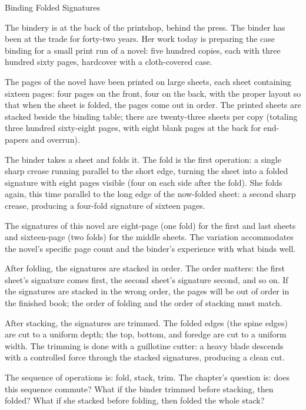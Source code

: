 \begin{coda}{Binding Folded Signatures}

The bindery is at the back of the printshop, behind the press. The
binder has been at the trade for forty-two years. Her work today is
preparing the case binding for a small print run of a novel: five
hundred copies, each with three hundred sixty pages, hardcover with
a cloth-covered case.

The pages of the novel have been printed on large sheets, each sheet
containing sixteen pages: four pages on the front, four on the back,
with the proper layout so that when the sheet is folded, the pages
come out in order. The printed sheets are stacked beside the binding
table; there are twenty-three sheets per copy (totaling three hundred
sixty-eight pages, with eight blank pages at the back for end-papers
and overrun).

The binder takes a sheet and folds it. The fold is the first
operation: a single sharp crease running parallel to the short edge,
turning the sheet into a folded signature with eight pages visible
(four on each side after the fold). She folds again, this time
parallel to the long edge of the now-folded sheet: a second sharp
crease, producing a four-fold signature of sixteen pages.

The signatures of this novel are eight-page (one fold) for the
first and last sheets and sixteen-page (two folds) for the middle
sheets. The variation accommodates the novel's specific page count
and the binder's experience with what binds well.

After folding, the signatures are stacked in order. The order matters:
the first sheet's signature comes first, the second sheet's signature
second, and so on. If the signatures are stacked in the wrong order,
the pages will be out of order in the finished book; the order of
folding and the order of stacking must match.

After stacking, the signatures are trimmed. The folded edges (the
spine edges) are cut to a uniform depth; the top, bottom, and
foredge are cut to a uniform width. The trimming is done with a
guillotine cutter: a heavy blade descends with a controlled force
through the stacked signatures, producing a clean cut.

The sequence of operations is: fold, stack, trim. The chapter's
question is: does this sequence commute? What if the binder
trimmed before stacking, then folded? What if she stacked before
folding, then folded the whole stack?


\end{coda}
